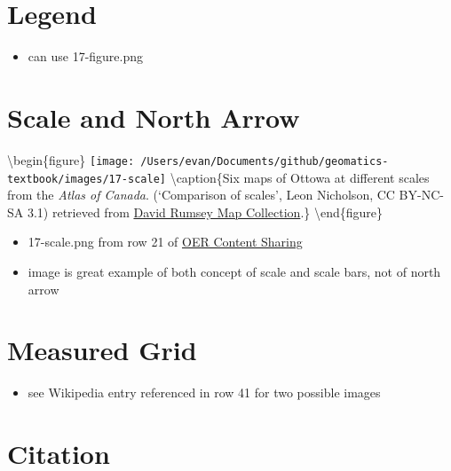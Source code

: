 \documentclass[
]{book}
\providecommand{\tightlist}{%
  \setlength{\itemsep}{0pt}\setlength{\parskip}{0pt}}
\begin{document}
\hypertarget{legend}{%
\section{Legend}\label{legend}}

\begin{itemize}
\tightlist
\item
  can use 17-figure.png
\end{itemize}

\hypertarget{scale-and-north-arrow}{%
\section{Scale and North Arrow}\label{scale-and-north-arrow}}

\textbackslash begin\{figure\}
\texttt{[image: /Users/evan/Documents/github/geomatics-textbook/images/17-scale]} \textbackslash caption\{Six maps of Ottowa at different scales from the \emph{Atlas of Canada}. (`Comparison of scales', \citet{Norman} Leon Nicholson, CC BY-NC-SA 3.1) retrieved from \href{https://www.davidrumsey.com/luna/servlet/detail/RUMSEY~8~1~323156~90092341:-6--Comparison-of-scales-}{David Rumsey Map Collection}.\}\label{fig:17-scale}
\textbackslash end\{figure\}

\begin{itemize}
\tightlist
\item
  17-scale.png from row 21 of \href{https://docs.google.com/spreadsheets/d/1LqzXn00wMeIjHWstNT3tMImNDZirLGc3g72jFOQc_8I/edit\#gid=817407192}{OER Content Sharing}
\item
  image is great example of both concept of scale and scale bars, not of north arrow
\end{itemize}

\hypertarget{measured-grid}{%
\section{Measured Grid}\label{measured-grid}}

\begin{itemize}
\tightlist
\item
  see Wikipedia entry referenced in row 41 for two possible images
\end{itemize}

\hypertarget{citation}{%
\section{Citation}\label{citation}}
\end{document}
